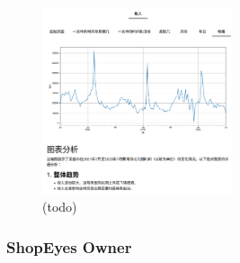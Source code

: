 \begin{figure}[htbp]
	\centering
	\includegraphics[width=0.5\textwidth]{./exp/aly-demo-5.png}
	\caption{(todo)}
	\label{fig:aly-demo-5}
\end{figure}

\subsubsection{ShopEyes Owner}

